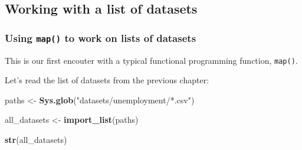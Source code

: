 \documentclass[]{gitbook}
\newenvironment{Shaded}{\begin{snugshade}}{\end{snugshade}}
\newcommand{\KeywordTok}[1]{\textcolor[rgb]{0.13,0.29,0.53}{\textbf{#1}}}
\newcommand{\NormalTok}[1]{#1}
\newcommand{\StringTok}[1]{\textcolor[rgb]{0.31,0.60,0.02}{#1}}
\theoremstyle{definition}
\theoremstyle{definition}
\theoremstyle{definition}
\theoremstyle{remark}
\begin{document}
\hypertarget{working-with-a-list-of-datasets}{%
\subsection{Working with a list of
datasets}\label{working-with-a-list-of-datasets}}

\hypertarget{using-map-to-work-on-lists-of-datasets}{%
\subsubsection{\texorpdfstring{Using \texttt{map()} to work on lists of
datasets}{Using map() to work on lists of datasets}}\label{using-map-to-work-on-lists-of-datasets}}

This is our first encouter with a typical functional programming
function, \texttt{map()}.

Let's read the list of datasets from the previous chapter:

\begin{Shaded}
\begin{Highlighting}[]
\NormalTok{paths <-}\StringTok{ }\KeywordTok{Sys.glob}\NormalTok{(}\StringTok{"datasets/unemployment/*.csv"}\NormalTok{)}

\NormalTok{all_datasets <-}\StringTok{ }\KeywordTok{import_list}\NormalTok{(paths)}

\KeywordTok{str}\NormalTok{(all_datasets)}
\end{Highlighting}
\end{Shaded}
\end{document}
